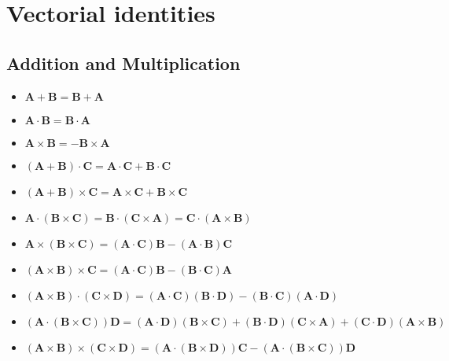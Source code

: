 \documentclass{article}
\begin{document}
\section{Vectorial identities}
\subsection{Addition and Multiplication}
\begin{itemize}
\item
  $\mathbf{A}+\mathbf{B}=\mathbf{B}+\mathbf{A}$
\item
  $\mathbf{A}\cdot\mathbf{B}=\mathbf{B}\cdot\mathbf{A}$
\item
  $\mathbf{A}\times\mathbf{B}=\mathbf{-B}\times\mathbf{A}$
\item
  $\left(\mathbf{A}+\mathbf{B}\right)\cdot\mathbf{C}=
  \mathbf{A}\cdot\mathbf{C}+\mathbf{B}\cdot\mathbf{C}$
\item
  $\left(\mathbf{A}+\mathbf{B}\right)\times\mathbf{C}=
  \mathbf{A}\times\mathbf{C}+\mathbf{B}\times\mathbf{C}$
\item
  $\mathbf{A}\cdot\left(\mathbf{B}\times\mathbf{C}\right)=
  \mathbf{B}\cdot\left(\mathbf{C}\times\mathbf{A}\right)=
  \mathbf{C}\cdot\left(\mathbf{A}\times\mathbf{B}\right)$
\item
  $\mathbf{A}\times\left(\mathbf{B}\times\mathbf{C}\right)=
  \left(\mathbf{A}\cdot\mathbf{C}\right)\mathbf{B}
  -\left(\mathbf{A}\cdot\mathbf{B}\right)\mathbf{C}$
\item
  $\left(\mathbf{A}\times\mathbf{B}\right)\times\mathbf{C}=
  \left(\mathbf{A}\cdot\mathbf{C}\right)\mathbf{B}
  -\left(\mathbf{B}\cdot\mathbf{C}\right)\mathbf{A}$
\item
  $\left(\mathbf{A}\times\mathbf{B}\right)
  \cdot\left(\mathbf{C}\times\mathbf{D}\right)=
  \left(\mathbf{A}\cdot\mathbf{C}\right)\left(\mathbf{B}\cdot\mathbf{D}\right)
  -\left(\mathbf{B}\cdot\mathbf{C}\right)\left(\mathbf{A}\cdot\mathbf{D}\right)$
\item
  $\left(\mathbf{A}\cdot\left(\mathbf{B}\times\mathbf{C}\right)\right)\mathbf{D}
  =\left(\mathbf{A}\cdot\mathbf{D}\right)\left(\mathbf{B}\times\mathbf{C}\right)
  +\left(\mathbf{B}\cdot\mathbf{D}\right)\left(\mathbf{C}\times\mathbf{A}\right)
  +\left(\mathbf{C}\cdot\mathbf{D}\right)\left(\mathbf{A}\times\mathbf{B}\right)
  $
\item
  $\left(\mathbf{A}\times\mathbf{B}\right)
  \times\left(\mathbf{C}\times\mathbf{D}\right)
  =\left(\mathbf{A}\cdot\left(\mathbf{B}\times\mathbf{D}\right)\right)\mathbf{C}
  -\left(\mathbf{A}\cdot\left(\mathbf{B}\times\mathbf{C}\right)\right)\mathbf{D}
  $
\end{itemize}
\end{document}
